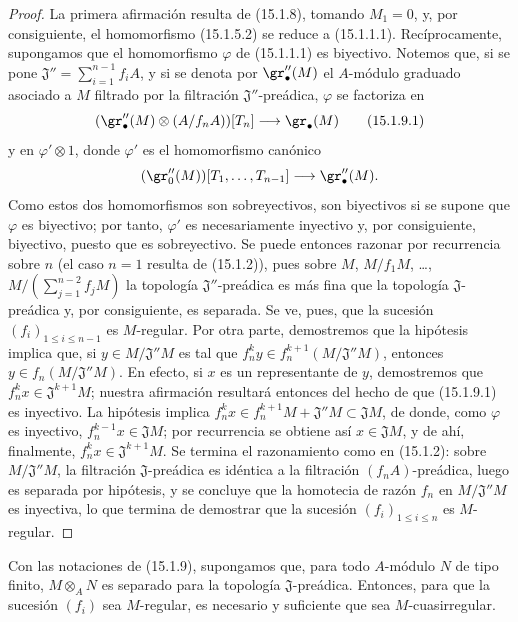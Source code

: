 \begin{proof}
La primera afirmación resulta de (15.1.8), tomando $M_1=0$, y, por
consiguiente, el homomorfismo (15.1.5.2) se reduce a (15.1.1.1).
Recíprocamente, supongamos que el homomorfismo $\varphi$ de (15.1.1.1) es
biyectivo. Notemos que, si se pone
$\mathfrak{J}''=\sum_{i=1}^{n-1}f_iA$,
y si se denota por $\gr''_\bullet(M)$ el $A$-módulo graduado asociado a $M$
filtrado por la filtración $\mathfrak{J}''$-preádica, $\varphi$ se factoriza en
\[
  (\gr''_\bullet(M)\otimes(A/f_nA))[T_n]\longrightarrow\gr_\bullet(M)
  \tag{15.1.9.1}\label{0.15.1.9.1-fr}
\]
y en $\varphi'\otimes1$, donde $\varphi'$ es el homomorfismo canónico
\[
  (\gr''_0(M))[T_1,\ldots,T_{n-1}]
  \longrightarrow\gr''_\bullet(M).
\]
Como estos dos homomorfismos son sobreyectivos, son biyectivos si se supone que
$\varphi$ es biyectivo; por tanto, $\varphi'$ es necesariamente inyectivo y,
por consiguiente, biyectivo, puesto que es sobreyectivo. Se puede entonces
razonar por recurrencia sobre $n$ (el caso $n=1$ resulta de (15.1.2)), pues
sobre
$M$, $M/f_1M$, \ldots, $M/(\sum_{j=1}^{n-2}f_jM)$
la topología $\mathfrak{J}''$-preádica es más fina que la topología
$\mathfrak{J}$-preádica y, por consiguiente, es separada. Se ve, pues, que la
sucesión $(f_i)_{1\leq i\leq n-1}$ es $M$-regular. Por otra parte, demostremos
que la hipótesis implica que, si $y\in M/\mathfrak{J}''M$ es tal que
$f_n^ky\in f_n^{k+1}(M/\mathfrak{J}''M)$,
entonces $y\in f_n(M/\mathfrak{J}''M)$. En efecto, si $x$ es un representante
de $y$, demostremos que $f_n^kx\in\mathfrak{J}^{k+1}M$; nuestra afirmación
resultará entonces del hecho de que (15.1.9.1) es inyectivo. La hipótesis
implica
$f_n^kx\in f_n^{k+1}M+\mathfrak{J}''M\subset\mathfrak{J}M$,
de donde, como $\varphi$ es inyectivo,
$f_n^{k-1}x\in\mathfrak{J}M$; por recurrencia se obtiene así
$x\in\mathfrak{J}M$, y de ahí, finalmente,
$f_n^kx\in\mathfrak{J}^{k+1}M$. Se termina el razonamiento como en
(15.1.2): sobre $M/\mathfrak{J}''M$, la filtración
$\mathfrak{J}$-preádica es idéntica a la filtración
$(f_nA)$-preádica, luego es separada por hipótesis, y se concluye que la
homotecia de razón $f_n$ en $M/\mathfrak{J}''M$ es inyectiva, lo que termina
de demostrar que la sucesión $(f_i)_{1\leq i\leq n}$ es $M$-regular.
\end{proof}

\begin{corollary}[15.1.10]
\label{0.15.1.10-fr}
Con las notaciones de \textup{(15.1.9)}, supongamos que, para todo $A$-módulo $N$ de
tipo finito, $M\otimes_A N$ es separado para la topología
$\mathfrak{J}$-preádica. Entonces, para que la sucesión $(f_i)$ sea
$M$-regular, es necesario y suficiente que sea $M$-cuasirregular.
\end{corollary}

